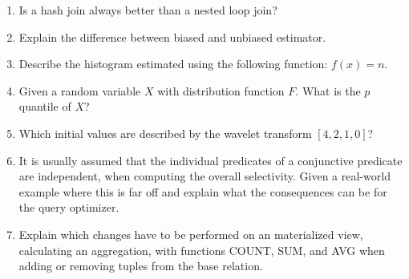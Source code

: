 \begin{enumerate}[label=\arabic*.]
  \item Is a hash join always better than a nested loop join?

  \item Explain the difference between biased and unbiased estimator.

  \item Describe the histogram estimated using the following function: $f(x) = n$.
  \item Given a random variable $X$ with distribution function $F$. What is the $p$ quantile of $X$?

  \item Which initial values are described by the wavelet transform $[4,2,1,0]$?
  \item It is usually assumed that the individual predicates of a conjunctive predicate are independent, when computing the overall selectivity. Given a real-world example where this is far off and explain what the consequences can be for the query optimizer.

  \item Explain which changes have to be performed on an materialized view, calculating an aggregation, with functions COUNT, SUM, and AVG when adding or removing tuples from the base relation.

\end{enumerate}



